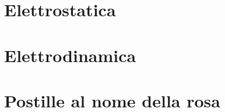 \documentclass[a4paper, 11pt, twoside, openright, italian]{memoir}
\begin{document}
\frontmatter

%
%

\mainmatter
\part{Elettrostatica}




\part{Elettrodinamica}

%
%
%
%
\part{Postille al nome della rosa}

%
%
%
%
%
%
\end{document}
